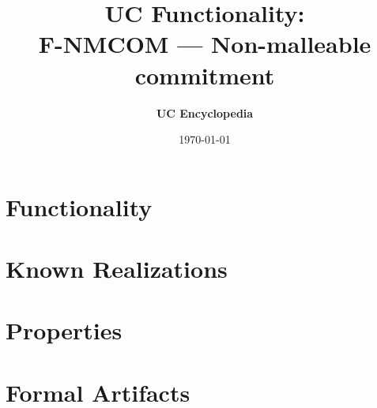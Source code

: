 \documentclass[11pt,a4paper]{article}
\title{\textbf{\Large UC Functionality:}\\[0.2em] \Large F-NMCOM --- Non-malleable commitment}
\author{\textbf{UC Encyclopedia}}
\date{\today}
\newtheorem{functionality}{Functionality}
\begin{document}
\maketitle

\begin{abstract}
\end{abstract}

\section{Functionality}

%

\section{Known Realizations}


\section{Properties}


\section{Formal Artifacts}

\end{document}
